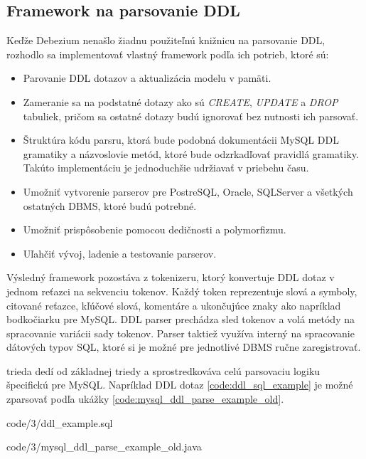 \subsection{Framework na parsovanie DDL}
Keďže Debezium nenašlo žiadnu použiteľnú knižnicu na parsovanie DDL, rozhodlo sa implementovať vlastný framework podľa ich potrieb, ktoré sú\cite{debezium:parse_ddl}:
\begin{itemize}
\item Parovanie DDL dotazov a aktualizácia modelu v pamäti. 
\item Zameranie sa na podstatné dotazy ako sú \textit{CREATE}, \textit{UPDATE} a \textit{DROP} tabuliek, pričom sa ostatné dotazy budú ignorovať bez nutnosti ich parsovať.
\item Štruktúra kódu parsru, ktorá bude podobná dokumentácii MySQL DDL gramatiky a názvoslovie metód, ktoré bude odzrkadľovať pravidlá gramatiky. Takúto implementáciu je jednoduchšie udržiavať v priebehu času.
\item Umožniť vytvorenie parserov pre PostreSQL, Oracle, SQLServer a všetkých ostatných DBMS, ktoré budú potrebné.
\item Umožniť prispôsobenie pomocou dedičnosti a polymorfizmu.
\item Uľahčiť vývoj, ladenie a testovanie parserov.
\end{itemize}

Výsledný framework pozostáva z tokenizeru, ktorý konvertuje DDL dotaz v jednom reťazci na sekvenciu tokenov. Každý token reprezentuje slová a symboly, citované reťazce, kľúčové slová, komentáre a ukončujúce znaky ako napríklad bodkočiarku pre MySQL. DDL parser prechádza sled tokenov a volá metódy na spracovanie variácii sady tokenov. Parser taktiež využíva interný  na spracovanie dátových typov SQL, ktoré si je možné pre jednotlivé DBMS ručne zaregistrovať.

 trieda dedí od základnej triedy  a sprostredkováva celú parsovaciu logiku špecifickú pre MySQL. Napríklad DDL dotaz \ref{code:ddl_sql_example} je možné zparsovať podľa ukážky \ref{code:mysql_ddl_parse_example_old}.


            {code/3/ddl_example.sql}
            

            {code/3/mysql_ddl_parse_example_old.java}
            
